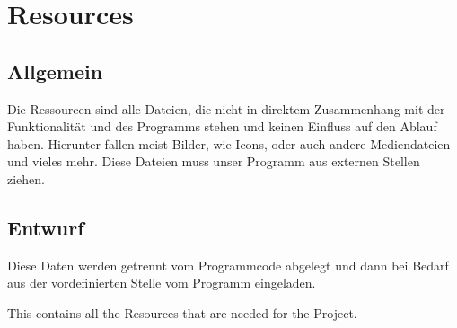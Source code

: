 	\section{Resources}
	\subsection{Allgemein}
		Die Ressourcen sind alle Dateien, die nicht in direktem Zusammenhang mit der Funktionalität und des Programms stehen und keinen Einfluss auf den Ablauf haben.
		Hierunter fallen meist Bilder, wie Icons, oder auch andere Mediendateien und vieles mehr.
		Diese Dateien muss unser Programm aus externen Stellen ziehen.
	
	\subsection{Entwurf} 
		Diese Daten werden getrennt vom Programmcode abgelegt und dann bei Bedarf aus der vordefinierten Stelle vom Programm eingeladen.
		
		
		This contains all the Resources that are needed for the Project.
		
